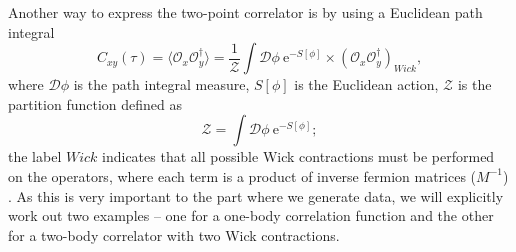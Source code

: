Another way to express the two-point correlator is by using a Euclidean path integral
\begin{equation}
    C_{xy}(\tau) = \langle \mathcal{O}_x\mathcal{O}^\dagger_y \rangle = \frac{1}{\mathcal{Z}} \int \mathcal{D}\phi \:\mathrm{e}^{-S[\phi]}\times \left(\mathcal{O}_x\mathcal{O}^\dagger_y\right)_{Wick},
    \label{eq:path-int}
\end{equation}
where $\mathcal{D}\phi$ is the path integral measure, $S[\phi]$ is the Euclidean action, $\mathcal{Z}$ is the partition function defined as
\begin{equation}
    \mathcal{Z} = \int \mathcal{D}\phi \:\mathrm{e}^{-S[\phi]};
\end{equation}
the label $Wick$ indicates that all possible Wick contractions must be performed on the operators, where each term is a product of inverse fermion matrices ($M^{-1}$) \cite{gattringer}. As this is very important to the part where we generate data, we will explicitly work out two examples -- one for a one-body correlation function and the other for a two-body correlator with two Wick contractions.

